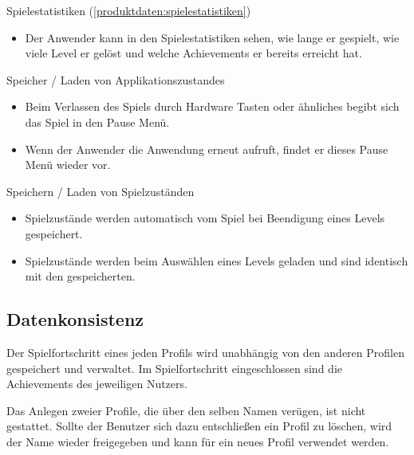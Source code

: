 \documentclass{scrartcl}
\begin{document}
\begin{telist}
\begin{itemize}
	\end{itemize}
	\item Spielestatistiken (\ref{produktdaten:spielestatistiken})
	\begin{itemize}
		\item Der Anwender kann in den Spielestatistiken sehen, wie lange er gespielt, wie viele Level er gelöst und welche Achievements er bereits erreicht hat.
	\end{itemize}
	\item Speicher / Laden von Applikationszustandes
	\begin{itemize}
		\item Beim Verlassen des Spiels durch Hardware Tasten oder ähnliches begibt sich das Spiel in den Pause Menü.
		\item Wenn der Anwender die Anwendung erneut aufruft, findet er dieses Pause Menü wieder vor.
	\end{itemize}
	\item Speichern / Laden von Spielzuständen
	\begin{itemize}
		\item Spielzustände werden automatisch vom Spiel bei Beendigung eines Levels gespeichert.
		\item Spielzustände werden beim Auswählen eines Levels geladen und sind identisch mit den gespeicherten.
	\end{itemize}
\end{telist}

\subsection{Datenkonsistenz}

\begin{telist}[resume]
	\item Der Spielfortschritt eines jeden Profils wird unabhängig von den anderen Profilen gespeichert und verwaltet. Im Spielfortschritt eingeschlossen sind die Achievements des jeweiligen Nutzers.
	\item Das Anlegen zweier Profile, die über den selben Namen verügen, ist nicht gestattet. Sollte der Benutzer sich dazu entschließen ein Profil zu löschen, wird der Name wieder freigegeben und kann für ein neues Profil verwendet werden.
\end{telist}

\clearpage
\end{document}
